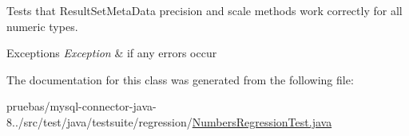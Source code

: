 Tests that Result\+Set\+Meta\+Data precision and scale methods work correctly for all numeric types.


\begin{DoxyExceptions}{Exceptions}
{\em Exception} & if any errors occur \\
\hline
\end{DoxyExceptions}


The documentation for this class was generated from the following file\+:\begin{DoxyCompactItemize}
\item 
pruebas/mysql-\/connector-\/java-\/8../src/test/java/testsuite/regression/\mbox{\hyperlink{_numbers_regression_test_8java}{Numbers\+Regression\+Test.\+java}}\end{DoxyCompactItemize}
